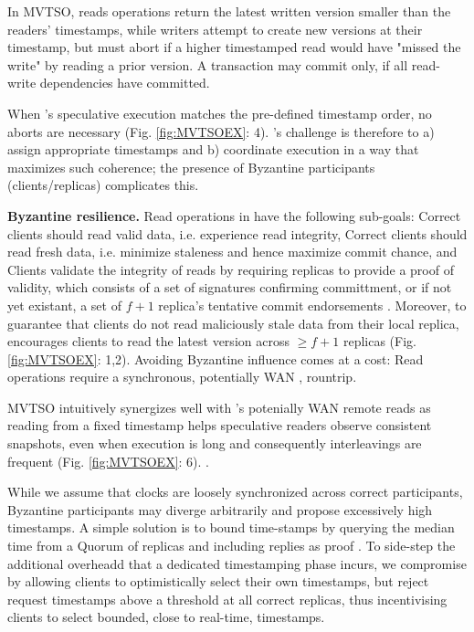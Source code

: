 In MVTSO, reads operations return the latest written version smaller than the readers' timestamps, while writers attempt to create new versions at their timestamp, but must abort if a higher timestamped read would have "missed the write" by reading a prior version. A transaction may commit only, if all read-write dependencies have committed.
\fi

When \sys{}'s speculative execution  matches the pre-defined timestamp order, no aborts are necessary (Fig. \ref{fig:MVTSOEX}: 4). \sys{}'s challenge is therefore to a) assign appropriate timestamps and b) coordinate execution in a way that maximizes such coherence; the presence of Byzantine participants (clients/replicas) complicates this. 

\par \textbf{Byzantine resilience.} Read operations in \sys have the following sub-goals: \one Correct clients should read valid data, i.e. experience read integrity, \two Correct clients should read fresh data, i.e. minimize staleness and hence maximize commit chance, and \three {}
Clients validate the integrity of reads by requiring replicas to provide a proof of validity, which consists of a set of signatures confirming committment, or if not yet existant, a set of  $f+1$ replica's tentative commit endorsements . Moreover, to guarantee that clients do not read maliciously stale data from their local replica, \sys encourages clients to read the latest version across $\geq f+1$ replicas (Fig. \ref{fig:MVTSOEX}: 1,2).
Avoiding Byzantine influence comes at a cost: Read operations require a synchronous, potentially WAN , rountrip. 

MVTSO intuitively synergizes well with \sys{}'s potenially WAN remote reads as reading from a fixed timestamp helps speculative readers observe consistent snapshots, even when execution is long and consequently interleavings are frequent (Fig. \ref{fig:MVTSOEX}: 6). .

While we assume that clocks are loosely synchronized across correct participants, Byzantine participants may diverge arbitrarily and propose excessively high timestamps. A simple solution is to bound time-stamps by querying the median time from a Quorum of replicas and including replies as proof \cite{bazzi2004non, bazzi2018clairvoyant}. To side-step the additional overheadd that a dedicated timestamping phase incurs, we compromise by allowing clients to optimistically select their own timestamps, but reject request timestamps above a threshold at all correct replicas, thus incentivising clients to select bounded, close to real-time, timestamps. 

